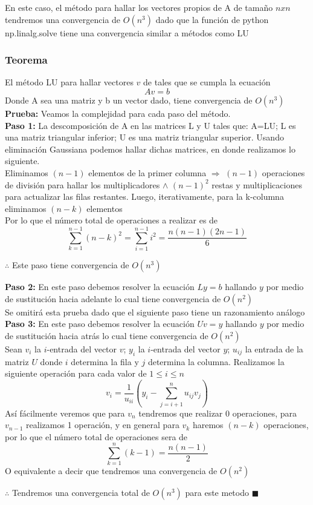En este caso, el método para hallar los vectores propios de A de tamaño $nxn$ tendremos una convergencia de $O(n^3)$ dado que la función de python np.linalg.solve tiene una convergencia similar a métodos como LU
\subsubsection{Teorema}
El método LU para hallar vectores $v$ de tales que se cumpla la ecuación $$Av=b$$ Donde A sea una matriz y b un vector dado, tiene convergencia de $O(n^3)$\\

\textbf{Prueba:} Veamos la complejidad para cada paso del método.\\
\textbf{Paso 1:} La descomposición de A en las matrices L y U tales que: A=LU; L es una matriz triangular inferior; U es una matriz triangular superior. Usando eliminación Gaussiana podemos hallar dichas matrices, en donde realizamos lo siguiente.\\
Eliminamos $(n-1)$ elementos de la primer columna $\Rightarrow$ $(n-1)$ operaciones de división para hallar los multiplicadores $\wedge$ $(n-1)^2$ restas y multiplicaciones para actualizar las filas restantes. Luego, iterativamente, para la k-columna eliminamos $(n-k)$ elementos\\ Por lo que el número total de operaciones a realizar es de $$\sum_{k=1}^{n-1}(n-k)^2=\sum_{i=1}^{n-1}i^2=\frac{n(n-1)(2n-1)}{6}$$ 
\begin{center}
    $\therefore$ Este paso tiene convergencia de $O(n^3)$
\end{center}
\textbf{Paso 2:} En este paso debemos resolver la ecuación $Ly=b$ hallando $y$ por medio de sustitución hacia adelante lo cual tiene convergencia de $O(n^2)$\\

Se omitirá esta prueba dado que el siguiente paso tiene un razonamiento análogo\\
\textbf{Paso 3:} En este paso debemos resolver la ecuación $Uv=y$ hallando $y$ por medio de sustitución hacia atrás lo cual tiene convergencia de $O(n^2)$\\
Sean $v_i$ la $i$-entrada del vector $v$; $y_i$ la $i$-entrada del vector $y$; $u_{ij}$ la entrada de la matriz $U$ donde $i$ determina la fila y $j$ determina la columna. Realizamos la siguiente operación para cada valor de $1\leqslant i\leqslant n$ $$v_i=\frac{1}{u_{ii}}\left(y_i-\sum_{j=i+1}^n u_{ij}v_j\right)$$
Así fácilmente veremos que para $v_n$ tendremos que realizar 0 operaciones, para $v_{n-1}$ realizamos 1 operación, y en general para $v_k$ haremos $(n-k)$ operaciones, por lo que el número total de operaciones sera de $$\sum_{k=1}^n(k-1)=\frac{n(n-1)}{2}$$ O equivalente a decir que tendremos una convergencia de $O(n^2)$ 
\begin{center}
    $\therefore$ Tendremos una convergencia total de $O(n^3)$ para este metodo $\blacksquare$
\end{center}

